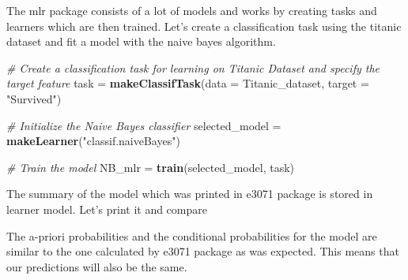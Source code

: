 \documentclass[]{book}
\newenvironment{Shaded}{\begin{snugshade}}{\end{snugshade}}
\newcommand{\CommentTok}[1]{\textcolor[rgb]{0.56,0.35,0.01}{\textit{#1}}}
\newcommand{\DataTypeTok}[1]{\textcolor[rgb]{0.13,0.29,0.53}{#1}}
\newcommand{\KeywordTok}[1]{\textcolor[rgb]{0.13,0.29,0.53}{\textbf{#1}}}
\newcommand{\NormalTok}[1]{#1}
\newcommand{\OperatorTok}[1]{\textcolor[rgb]{0.81,0.36,0.00}{\textbf{#1}}}
\newcommand{\StringTok}[1]{\textcolor[rgb]{0.31,0.60,0.02}{#1}}
\begin{document}
The mlr package consists of a lot of models and works by creating tasks and learners which are then trained. Let's create a classification task using the titanic dataset and fit a model with the naive bayes algorithm.

\begin{Shaded}
\begin{Highlighting}[]
\CommentTok{# Create a classification task for learning on Titanic Dataset and specify the target feature}
\NormalTok{task =}\StringTok{ }\KeywordTok{makeClassifTask}\NormalTok{(}\DataTypeTok{data =}\NormalTok{ Titanic_dataset, }\DataTypeTok{target =} \StringTok{"Survived"}\NormalTok{)}

\CommentTok{# Initialize the Naive Bayes classifier}
\NormalTok{selected_model =}\StringTok{ }\KeywordTok{makeLearner}\NormalTok{(}\StringTok{"classif.naiveBayes"}\NormalTok{)}

\CommentTok{# Train the model}
\NormalTok{NB_mlr =}\StringTok{ }\KeywordTok{train}\NormalTok{(selected_model, task)}
\end{Highlighting}
\end{Shaded}

The summary of the model which was printed in e3071 package is stored in learner model. Let's print it and compare

\begin{Shaded}
\end{Shaded}

The a-priori probabilities and the conditional probabilities for the model are similar to the one calculated by e3071 package as was expected. This means that our predictions will also be the same.
\end{document}
